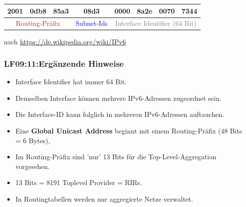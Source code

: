 \begin{frame}[fragile]
\begin{tiny}
\begin{center}
\begin{tabular}{|c|c|c|c|c|c|c|c|c|c|c|c|c|c|c|c|}
     
    \hline

    \multicolumn{2}{|c|}{2001} & \multicolumn{2}{c|}{0db8} &
      \multicolumn{2}{c|}{85a3} & \multicolumn{2}{c|}{08d3} &
        \multicolumn{2}{c|}{0000} & \multicolumn{2}{c|}{8a2e} &
          \multicolumn{2}{c|}{0070} & \multicolumn{2}{c|}{7344} \\
    \hline
    \multicolumn{6}{|c|}{\tiny{\textcolor{red}{Routing-Präfix}}} &
    \multicolumn{2}{c|}{\tiny{\textcolor{blue}{Subnet-Ids}}} &
    \multicolumn{8}{c|}{\footnotesize{\textcolor{gray}{Interface Identifier (64 Bit)}}}\\  
    \hline
    \end{tabular}
  \end{center}
\end{tiny}

\vspace{0.4cm}
\begin{flushright}
\begin{tiny}
nach  \href{https://de.wikipedia.org/wiki/IPv6}{https://de.wikipedia.org/wiki/IPv6}
\end{tiny}
\end{flushright}
\end{frame}

\begin{frame}
  \frametitle{LF09:11:Ergänzende Hinweise}
  \begin{footnotesize}
    \begin{itemize}
      \item Interface Identifier hat immer 64 Bit.
      \item Demselben Interface können mehrere IPv6-Adressen zugeordnet sein.
      \item Die Interface-ID kann folglich in mehreren IPv6-Adressen auftauchen.
      \item Eine \textbf{Global Unicast Address} beginnt mit einem Routing-Präfix (48 Bits = 6 Bytes), 
      \item Im Routing-Präfix sind 'nur' 13 Bits für die Top-Level-Aggregation vorgesehen.   
      \item 13 Bits = 8191 Toplevel Provider = RIRs.
      \item In Routingtabellen werden nur aggregierte Netze verwaltet.
    \end{itemize}
  \end{footnotesize}
  \vspace{0.4cm}
  \begin{tiny}
      \cite[vgl. dazu][188ff]{Schreiner2014a}
  \end{tiny}
\end{frame}

